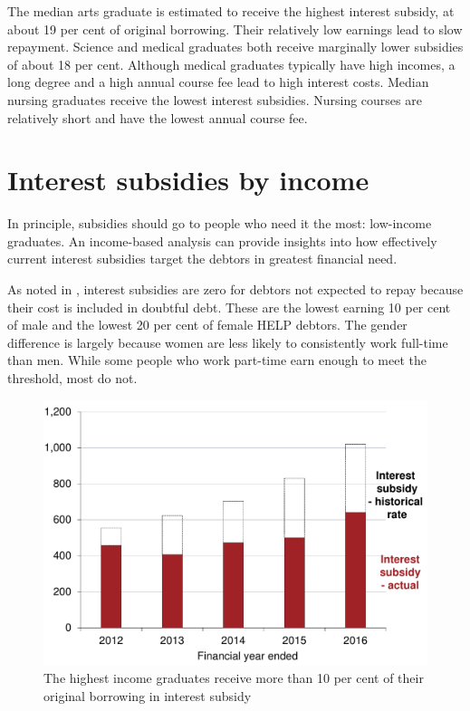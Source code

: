\documentclass[embargoed]{grattan}
\begin{document}
The median arts graduate is estimated to receive the highest interest subsidy, at about 19 per cent of original borrowing.
Their relatively low earnings lead to slow repayment.
Science and medical graduates both receive marginally lower subsidies of about 18 per cent.
Although medical graduates typically have high incomes, a long degree and a high annual course fee lead to high interest costs.
Median nursing graduates receive the lowest interest subsidies.
Nursing courses are relatively short and have the lowest annual course fee.

\section{Interest subsidies by income}\label{sec:interest-subsidies-by-income}

In principle, subsidies should go to people who need it the most: low-income graduates.
An income-based analysis can provide insights into how effectively current interest subsidies target the debtors in greatest financial need.

As noted in , interest subsidies are zero for debtors not expected to repay because their cost is included in doubtful debt.
These are the lowest earning 10 per cent of male and the lowest 20 per cent of female \gls{HELP} debtors.
The gender difference is largely because women are less likely to consistently work full-time than men.
While some people who work part-time earn enough to meet the threshold, most do not.

\begin{figure}
\caption{The highest income graduates receive more than 10 per cent of their original borrowing in interest subsidy}\label{fig:fig10-highest-income-grads-receive-over-10pc-original-borrowing-interest-subsidy}

\includegraphics[page=10]{atlas/Chartpack.pdf}

\end{figure}
\end{document}

